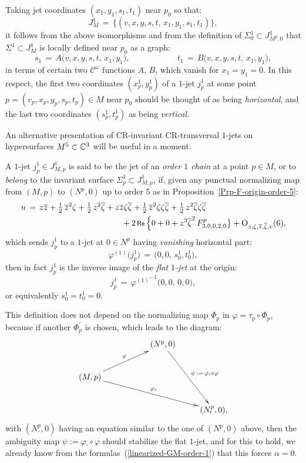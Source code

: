 \documentclass[12pt,twoside,leqno,openany]{amsart}
\begin{document}
Taking jet coordinates $(x_1, y_1, s_1, t_1)$ near $p_0$ so that:
\[
J_M^1
\,=\,
\big\{
(v,x,y,s,t,\,x_1,y_1,s_1,t_1)
\big\},
\]
it follows from the above isomorphisms and from the definition
of $\Sigma_0^1 \subset J_{M^p,0}^1$ 
that $\Sigma^1 \subset J_M^1$ is locally defined near $p_0$
as a graph:
\[
s_1
\,=\,
A\big(v,x,y,s,t,\,x_1,y_1\big),
\ \ \ \ \ \ \ \ \ \ \ \ \ \ \ \ \ \ \ \ \ \ \ \ \ \
t_1
\,=\,
B\big(v,x,y,s,t,\,x_1,y_1\big),
\]
in terms of certain two $\mathcal{C}^\omega$ functions $A$, $B$,
which vanish for $x_1 = y_1 = 0$.
In this respect, the first two coordinates $(x_p^1, y_p^1)$ of a
$1$-jet $j_p^1$ at some point $p = (v_p, x_p, y_p, s_p, t_p)
\in M$ near $p_0$ should be thought of
as being {\sl horizontal}, and
the last two coordinates $(s_p^1, t_p^1)$ as being {\sl vertical}.

An alternative presentation of CR-invariant
CR-transversal $1$-jets on hypersurfaces $M^5 \subset \mathbb{C}^3$
will be useful in a moment.

\begin{Definition}
\label{Def-order-1-chains}
A $1$-jet $j_p^1 \in J_{M,p}^1$ is said to be the jet of an {\sl order
$1$ chain} at a point $p \in M$, or to {\em belong} to
the invariant surface $\Sigma_p^1 \subset J_{M,p}^1$,
if, given any punctual normalizing map 
from $(M, p)$ to $(N^p, 0)$ up to
order $5$ as in 
Proposition~{\ref{Prp-F-origin-order-5}}:
\[
\aligned
u
&
\,=\,
z\overline{z}
+
\tfrac{1}{2}\,\overline{z}^2\zeta
+
\tfrac{1}{2}\,z^2\overline{\zeta}
+
z\overline{z}\zeta\overline{\zeta}
+
\tfrac{1}{2}\,\overline{z}^2\zeta\zeta\overline{\zeta}
+
\tfrac{1}{2}\,z^2\overline{\zeta}\zeta\overline{\zeta}
\\
&
\ \ \ \ \ \ \ \ \ \ \ \ \ \ \ \ \ \ \ \ \ \ \ \ \ \ \ \ \ \ \ \ \ \ \
+
2\,\Re\,
\Big\{
0
+
0
+
z^3\overline{\zeta}^2\,
F_{3,0,0,2,0}^p
\big\}
+
{\rm O}_{z,\zeta,\overline{z},\overline{\zeta},v}(6),
\endaligned
\]
which sends $j_p^1$ to a $1$-jet at $0 \in N^p$ having
{\em vanishing} horizontal part:
\[
\varphi^{(1)}\big(j_p^1\big)
\,=\,
\big(0,0,\,s_0^1,t_0^1\big),
\]
then in fact $j_p^1$ is the inverse image of the {\em flat
$1$-jet} at the origin:
\[
j_p^1
\,=\,
{\varphi^{(1)}}^{-1}
\big(0,0,\,0,0\big),
\]
or equivalently $s_0^1 = t_0^1 = 0$.
\end{Definition}

This definition does not depend on the normalizing map $\Phi_p$
in $\varphi = \tau_p \circ \Phi_p$, because if another
$\Phi_p^\prime$ is chosen, which leads to the diagram:
\[
\xymatrix{
& &
(N^p,0)
\ar[ddr]^{\psi\,:=\,\varphi_\prime\circ\varphi}
\\
(M,p)
\ar[rru]^{\varphi}
\ar[rrrd]^{\varphi_\prime}
&
&
&
\\
& & &
(N_\prime^p,0),
}
\]
with $(N_\prime^p, 0)$ having an equation similar to the one
of $(N^p, 0)$ above, then the ambiguity map $\psi := 
\varphi_\prime \circ \varphi$ should stabilize the
flat $1$-jet,
and for this to hold, we already know 
from the formulas~({\ref{linearized-GM-order-1}})
that this forces $\alpha = 0$. 
\end{document}
